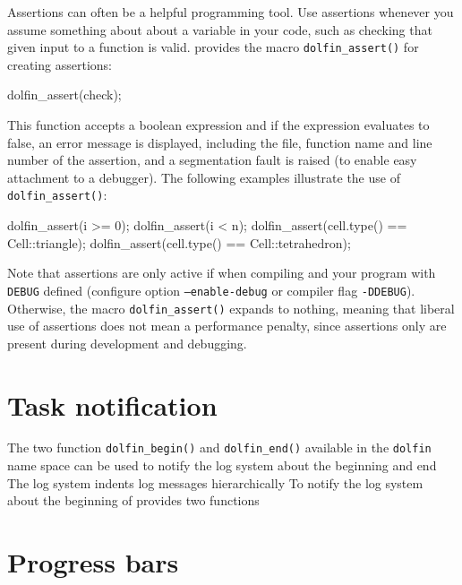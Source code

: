 Assertions can often be a helpful programming tool. Use assertions
whenever you assume something about about a variable in your code,
such as checking that given input to a function is valid. \dolfin{}
provides the macro \texttt{dolfin\_assert()} for creating assertions:
\begin{code}
  dolfin\_assert(check);
\end{code}
This function accepts a boolean expression and if the expression
evaluates to false, an error message is displayed, including the
file, function name and line number of the assertion, and a
segmentation fault is raised (to enable easy attachment to a
debugger). The following examples illustrate the use of
\texttt{dolfin\_assert()}:
\begin{code}
  dolfin_assert(i >= 0);
  dolfin_assert(i < n);
  dolfin_assert(cell.type() == Cell::triangle);
  dolfin_assert(cell.type() == Cell::tetrahedron);
\end{code}
Note that assertions are only active if \dolfin{} when compiling
\dolfin{} and your program with \texttt{DEBUG} defined (configure
option \texttt{--enable-debug} or compiler flag \texttt{-DDEBUG}).
Otherwise, the macro \texttt{dolfin\_assert()} expands to nothing,
meaning that liberal use of assertions does not mean a performance
penalty, since assertions only are present during development and
debugging.

\section{Task notification}

The two function \texttt{dolfin\_begin()} and \texttt{dolfin\_end()}
available in the \texttt{dolfin} name space can be used to notify the
\dolfin{} log system about the beginning and end
The \dolfin{} log system indents log messages hierarchically 
To notify the \dolfin{} log system about the beginning of 
\dolfin{} provides two functions 

\section{Progress bars}

